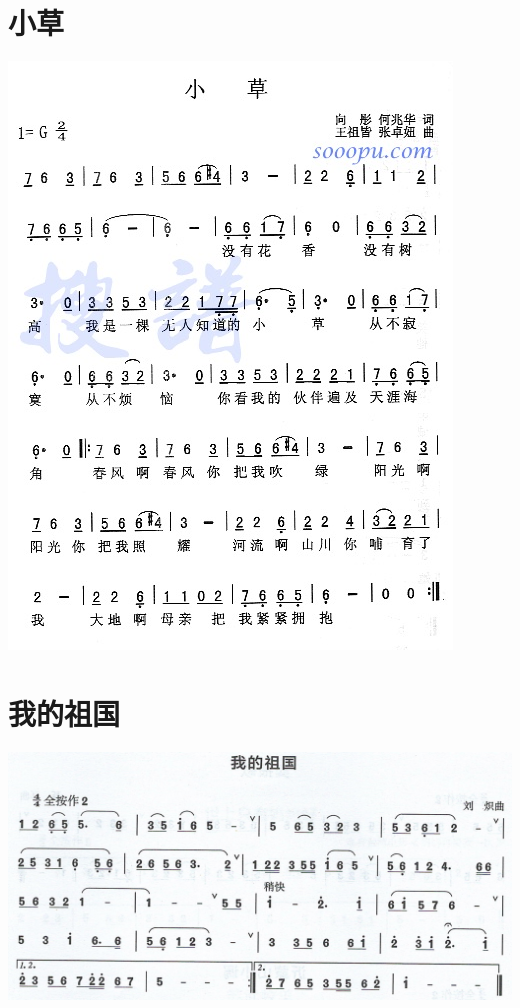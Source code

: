 \documentclass[cn,pad,chinesefont=nofont,twocol]{elegantbook}
\begin{document}
\section{小草}
	\includegraphics[width=\textwidth]{dongxiao/20200627-小草.jpg}  
\section{我的祖国}
    \includegraphics[width=\textwidth]{dongxiao/20200711-我的祖国.jpeg}
\end{document}
